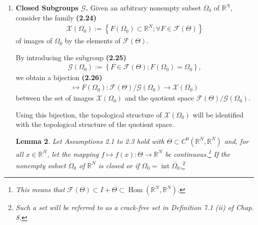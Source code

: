 \documentclass{book}
\numberwithin{equation}{section}
\newtheorem{lemma}{Lemma}[section]
\begin{document}
\begin{enumerate}
    \begin{lemma}
        Assume that $(\mathcal{F}_k,d_k)$, $k\ge 0$, is a family of groups each complete w.r.t. their metric $d_k$ and that \textbf{(2.23)}
        \begin{align*}
            \forall k\ge 0,\ \mathcal{F}_{k+1}\subset\mathcal{F}_k \mbox{ and } d_k(F,G)\le d_{k+1}(F,G),\ \forall F,G\in\bigcap_{k=0}^\infty \mathcal{F}_k.
        \end{align*}
        Then the intersection $\mathcal{F}_\infty = \bigcap_{k=0}^\infty \mathcal{F}_k$ is a group that is complete w.r.t. the metric $d_\infty$ defined in (2.22). If, in addition, each $(\mathcal{F}_k,d_k)$ is a topological (metric) group, then $\mathcal{F}_\infty$ is a topological (metric) group.
    \end{lemma}
    \item \textbf{Closed Subgroups $\mathcal{G}$.} Given an arbitrary nonempty subset $\Omega_0$ of $\mathbb{R}^N$, consider the family \textbf{(2.24)}
    \begin{align*}
        \mathcal{X}\left(\Omega_0\right) := \left\{F\left(\Omega_0\right)\subset\mathbb{R}^N;\forall F\in\mathcal{F}(\Theta)\right\}
    \end{align*}
    of images of $\Omega_0$ by the elements of $\mathcal{F}(\Theta)$.
    
    By introducing the subgroup \textbf{(2.25)}
    \begin{align*}
        \mathcal{G}\left(\Omega_0\right) := \left\{F\in\mathcal{F}(\Theta);F\left(\Omega_0\right) = \Omega_0\right\},
    \end{align*}
    we obtain a bijection \textbf{(2.26)}
    \begin{align*}
        [F]\mapsto F\left(\Omega_0\right):\mathcal{F}(\Theta)/\mathcal{G}\left(\Omega_0\right)\to\mathcal{X}\left(\Omega_0\right)
    \end{align*}
    between the set of images $\mathcal{X}(\Omega_0)$ and the quotient space $\mathcal{F}(\Theta)/\mathcal{G}(\Omega_0)$.
    
    Using this bijection, the topological structure of $\mathcal{X}(\Omega_0)$ will be identified with the topological structure of the quotient space.
    
    \begin{lemma}
        Let Assumptions 2.1 to 2.3 hold with $\Theta\subset C^0(\mathbb{R}^N,\mathbb{R}^N)$ and, for all $x\in\mathbb{R}^N$, let the mapping $f\mapsto f(x):\Theta\to\mathbb{R}^N$ be continuous.\footnote{This means that $\mathcal{F}(\Theta)\subset I + \Theta\subset\operatorname{Hom}(\mathbb{R}^N,\mathbb{R}^N)$.} If the nonempty subset $\Omega_0$ of $\mathbb{R}^N$ is closed or if $\Omega_0 = \operatorname{int}\overline{\Omega_0}$,\footnote{Such a set will be referred to as a \textit{crack-free} set in Definition 7.1 (ii) of Chap. 8.
            
}
\end{lemma}
\end{enumerate}
\end{document}
